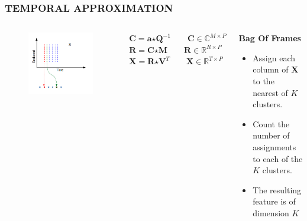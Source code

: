 \documentclass{beamer}
\begin{document}
\begin{frame}
\frametitle{TEMPORAL APPROXIMATION}
\begin{columns}[c]
\begin{figure}
\includegraphics[width=\textwidth]{tmp_2}
\end{figure}
$\textbf{C} = \textbf{a} \bm{\star} \textbf{Q}^{-1} \qquad \textbf{C} \in \mathbb{C}^{M \times P}$\\
$\textbf{R} = \textbf{C} \bm{\star} \textbf{M} \qquad \textbf{R} \in \mathbb{R}^{R \times P}$
$\textbf{X} = \textbf{R} \bm{\star} \textbf{V}^{T} \qquad \textbf{X} \in \mathbb{R}^{T \times P}$\\
\begin{block}{\textbf{Bag Of Frames}}
\begin{itemize}
\item Assign each column of $\textbf{X}$ to the nearest of $K$ clusters.
\item Count the number of assignments to each of the $K$ clusters.
\item The resulting feature is of dimension $K$
\end{itemize}
\end{block}
\end{columns}
\end{frame}
\end{document}
